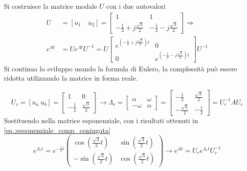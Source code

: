 Si costruisce la matrice modale $U$ con i due autovalori
$$\begin{aligned}
U &= [u_1 \quad u_2] = \begin{bmatrix}
1 & 1 \\
-\frac{1}{2}+j\frac{\sqrt{3}}{2} & -\frac{1}{2}-j\frac{\sqrt{3}}{2}
\end{bmatrix}\Rightarrow \\
e^{At} &= Ue^{\Lambda t} U^{-1} = U\begin{bmatrix}
e^{\left(-\frac{1}{2}+j\frac{\sqrt{3}}{2}\right)t} & 0\\
0 & e^{\left(-\frac{1}{2}-j\frac{\sqrt{3}}{2}\right)t}
\end{bmatrix}U^{-1}
\end{aligned}$$
Si continua lo sviluppo usando la formula di Eulero, la complessità
può essere ridotta utilizzando la matrice in forma reale.

$$
U_r = [u_a \ u_b] = \begin{bmatrix}
1 & 0 \\
-\frac{1}{2} & \frac{\sqrt{3}}{2}
\end{bmatrix} \longrightarrow \Lambda_r =\begin{bmatrix}
\alpha & \omega \\
-\omega & \alpha
\end{bmatrix}=
\begin{bmatrix}
-\frac{1}{2} & \frac{\sqrt{3}}{2}\\
-\frac{\sqrt{3}}{2} & -\frac{1}{2}
\end{bmatrix} = U_r^{-1}AU_r
$$
Sostituendo nella matrice esponenziale, con i risultati ottenuti in
\ref{eq.:esponenziale_comp_coniugata}
$$
e^{\Lambda_r t} = e^{-\frac{1}{2}t}\begin{pmatrix}
\cos \left(\frac{\sqrt{3}}{2}t\right) & \sin \left(\frac{\sqrt{3}}{2}t\right) \\
-\sin \left(\frac{\sqrt{3}}{2}t\right) & \cos \left(\frac{\sqrt{3}}{2}t\right)
\end{pmatrix}\rightarrow
e^{At} = U_r e^{\Lambda_r t} U_r^{-1}
$$

